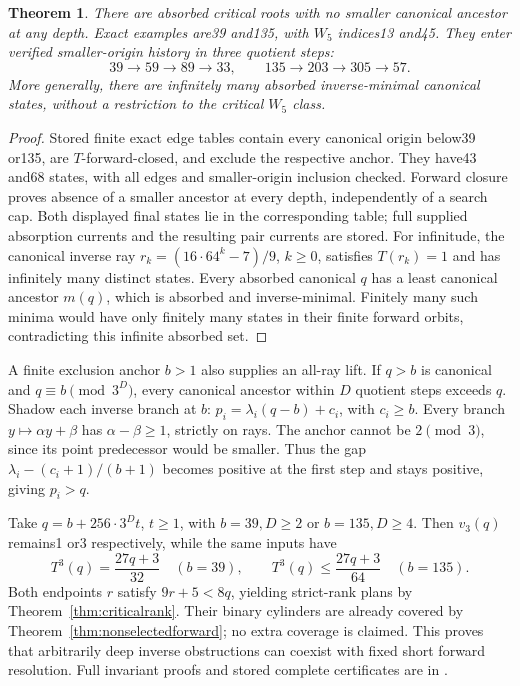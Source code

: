 \documentclass[11pt]{article}
\newtheorem{theorem}{Theorem}
\begin{document}
\begin{theorem}\label{thm:permanentinverse}
There are absorbed critical roots with no smaller canonical ancestor at
any depth. Exact examples are39 and135, with $W_5$ indices13 and45.
They enter verified smaller-origin history in three quotient steps:
\[
 39\to59\to89\to33,\qquad135\to203\to305\to57.
\]
More generally, there are infinitely many absorbed inverse-minimal
canonical states, without a restriction to the critical $W_5$ class.
\end{theorem}
\begin{proof}
Stored finite exact edge tables contain every canonical origin below39
or135, are $T$-forward-closed, and exclude the respective anchor. They
have43 and68 states, with all edges and smaller-origin inclusion checked.
Forward closure proves absence of a smaller ancestor at every depth,
independently of a search cap. Both displayed final states lie in the
corresponding table; full supplied absorption currents and the resulting
pair currents are stored.
For infinitude, the canonical inverse ray
$r_k=(16\cdot64^k-7)/9$, $k\ge0$, satisfies $T(r_k)=1$ and has infinitely
many distinct states. Every absorbed canonical $q$ has a least canonical
ancestor $m(q)$, which is absorbed and inverse-minimal. Finitely many
such minima would have only finitely many states in their finite forward
orbits, contradicting this infinite absorbed set.
\end{proof}

A finite exclusion anchor $b>1$ also supplies an all-ray lift. If $q>b$
is canonical and $q\equiv b\pmod{3^D}$, every canonical ancestor within
$D$ quotient steps exceeds $q$. Shadow each inverse branch at $b$:
$p_i=\lambda_i(q-b)+c_i$, with $c_i\ge b$. Every branch
$y\mapsto\alpha y+\beta$ has $\alpha-\beta\ge1$, strictly on rays.
The anchor cannot be $2\pmod3$, since its point predecessor would be
smaller. Thus the gap $\lambda_i-(c_i+1)/(b+1)$ becomes positive at
the first step and stays positive, giving $p_i>q$.

Take $q=b+256\cdot3^Dt$, $t\ge1$, with $b=39,D\ge2$ or $b=135,D\ge4$.
Then $v_3(q)$ remains1 or3 respectively, while the same inputs have
\[
 T^3(q)=\frac{27q+3}{32}\quad(b=39),\qquad
 T^3(q)\le\frac{27q+3}{64}\quad(b=135).
\]
Both endpoints $r$ satisfy $9r+5<8q$, yielding strict-rank plans by
Theorem~\ref{thm:criticalrank}. Their binary cylinders are already
covered by Theorem~\ref{thm:nonselectedforward}; no extra coverage is
claimed. This proves that arbitrarily deep inverse obstructions can
coexist with fixed short forward resolution. Full invariant proofs and
stored complete certificates are in
.
\end{document}
